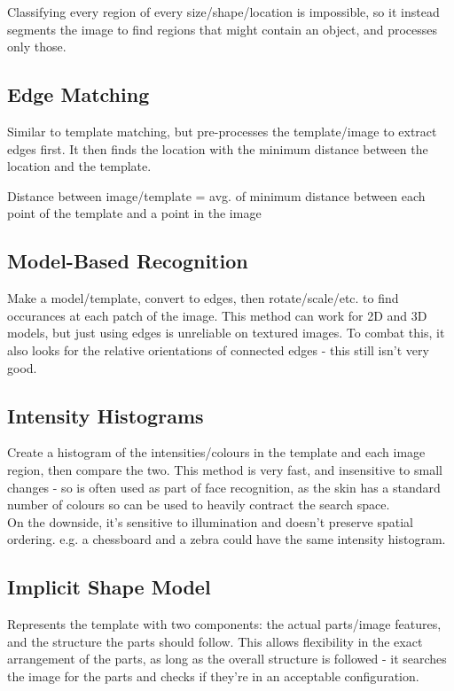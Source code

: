 Classifying every region of every size/shape/location is impossible, so it instead segments the image to find regions that might contain an object, and processes only those. 

\subsection{Edge Matching}
Similar to template matching, but pre-processes the template/image to extract edges first. It then finds the location with the minimum distance between the location and the template.
\begin{center}
    Distance between image/template = avg. of minimum distance between each point of the template and a point in the image
\end{center}

\subsection{Model-Based Recognition}
Make a model/template, convert to edges, then rotate/scale/etc. to find occurances at each patch of the image. This method can work for 2D and 3D models, but just using edges is unreliable on textured images. To combat this, it also looks for the relative orientations of connected edges - this still isn't very good. 

\subsection{Intensity Histograms}
Create a histogram of the intensities/colours in the template and each image region, then compare the two. This method is very fast, and insensitive to small changes - so is often used as part of face recognition, as the skin has a standard number of colours so can be used to heavily contract the search space.\\
On the downside, it's sensitive to illumination and doesn't preserve spatial ordering. e.g. a chessboard and a zebra could have the same intensity histogram. 

\subsection{Implicit Shape Model}
Represents the template with two components: the actual parts/image features, and the structure the parts should follow. This allows flexibility in the exact arrangement of the parts, as long as the overall structure is followed - it searches the image for the parts and checks if they're in an acceptable configuration.

